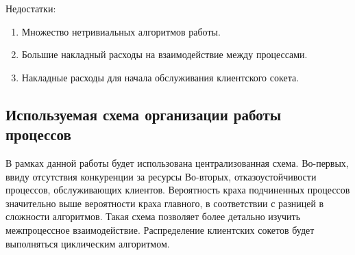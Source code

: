 Недостатки:
\begin{enumerate}
\item Множество нетривиальных алгоритмов работы.
\item Большие накладный расходы на взаимодействие между процессами.
\item Накладные расходы для начала обслуживания клиентского сокета.
\end{enumerate}

\subsection{Используемая схема организации работы процессов}

В рамках данной работы будет использована централизованная схема.
Во-первых, ввиду отсутствия конкуренции за ресурсы
Во-вторых, отказоустойчивости процессов, обслуживающих клиентов.
Вероятность краха подчиненных процессов значительно выше вероятности краха главного, в соответствии с разницей в сложности алгоритмов.
Такая схема позволяет более детально изучить межпроцессное взаимодействие.
Распределение клиентских сокетов будет выполняться циклическим алгоритмом.
